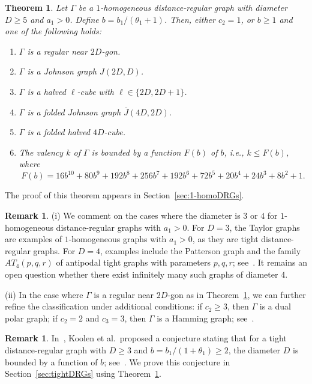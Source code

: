 \documentclass[11pt]{article}
\newtheorem{theorem}[theo]{Theorem}
\theoremstyle{definition}
\newtheorem{rema}[theo]{Remark}
\numberwithin{equation}{section}
\numberwithin{equation}{section}
\begin{document}
\begin{theorem}\label{thm:main}
Let $\Gamma$ be a $1$-homogeneous distance-regular graph with diameter $D \geqslant 5$ and $a_1 > 0$. 
Define $b = {b_1}/({\theta_1 + 1})$. 
Then, either $c_2=1$, or $b\geqslant 1$ and one of the following holds:
\begin{enumerate}[\normalfont(i)]
	\item $\Gamma$ is a regular near $2D$-gon.
	\item $\Gamma$ is a Johnson graph $J(2D,D)$.
	\item $\Gamma$ is a halved $\ell$-cube with $\ell \in \{2D,2D+1\}$.
	\item $\Gamma$ is a folded Johnson graph $\bar{J}(4D,2D)$.
	\item $\Gamma$ is a folded halved $4D$-cube.
	\item The valency $k$ of $\Gamma$ is bounded by a function $F(b)$ of $b$, {\rm i.e.}, $k \leqslant F(b)$, where
	\begin{equation}\label{poly: F}
	F(b) = 16b^{10} + 80b^9 + 192b^8 + 256b^7 + 192b^6 + 72b^5 + 20b^4 + 24b^3 + 8b^2 + 1. 
	\end{equation}
\end{enumerate}
\end{theorem}
The proof of this theorem appears in Section~\ref{sec:1-homoDRGs}.

\begin{rema} 
(i) We comment on the cases where the diameter is $3$ or $4$ for $1$-homogeneous distance-regular graphs with $a_1 > 0$.
For $D = 3$, the Taylor graphs are examples of $1$-homogeneous graphs with $a_1 > 0$, as they are tight distance-regular graphs. 
For $D = 4$, examples include the Patterson graph and the family $AT_4(p, q, r)$ of antipodal tight graphs with parameters $p, q, r$; see~\cite{JK2002, JK2011}. 
It remains an open question whether there exist infinitely many such graphs of diameter $4$.

(ii) In the case where $\Gamma$ is a regular near $2D$-gon as in Theorem~\ref{thm:main}, we can further refine the classification under additional conditions: 
if $c_2 \geqslant 3$, then $\Gamma$ is a dual polar graph; 
if $c_2 = 2$ and $c_3 = 3$, then $\Gamma$ is a Hamming graph; see~\cite[Theorem~9.11]{DaKoTa}.
\end{rema}


\begin{rema}
In~\cite{KLLLLT2023+}, Koolen et al.\ proposed a conjecture stating that for a tight distance-regular graph with $D \geqslant 3$ and $b = b_1 / (1 + \theta_1) \geqslant 2$, the diameter $D$ is bounded by a function of $b$; see~\cite[Conjecture 7.5]{KLLLLT2023+}. We prove this conjecture in Section~\ref{sec:tightDRGs} using Theorem~\ref{thm:main}.
\end{rema}
\end{document}
